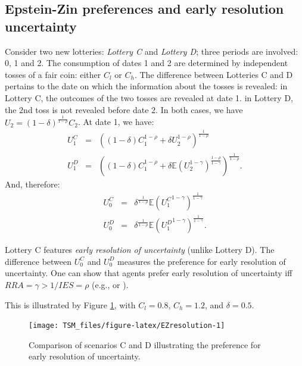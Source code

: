 \documentclass[
  12pt,
]{book}
\theoremstyle{definition}
\theoremstyle{definition}
\theoremstyle{definition}
\theoremstyle{definition}
\theoremstyle{remark}
\begin{document}
\hypertarget{epstein-zin-preferences-and-early-resolution-uncertainty}{%
\subsection{Epstein-Zin preferences and early resolution uncertainty}\label{epstein-zin-preferences-and-early-resolution-uncertainty}}

Consider two new lotteries: \emph{Lottery C} and \emph{Lottery D}; three periods are involved: 0, 1 and 2. The consumption of dates 1 and 2 are determined by independent tosses of a fair coin: either \(C_l\) or \(C_h\). The difference between Lotteries C and D pertains to the date on which the information about the tosses is revealed: in Lottery C, the outcomes of the two tosses are revealed at date 1. in Lottery D, the \(2\)nd toss is not revealed before date \(2\).
In both cases, we have \(U_2 = (1-\delta)^{\frac{1}{1-\rho}}C_{2}\).
At date 1, we have:
\begin{eqnarray*}
U_1^C &=& \left((1-\delta)C_1^{1-\rho} + \delta U_2^{1-\rho}\right)^{\frac{1}{1-\rho}}\\
U_1^D &=& \left((1-\delta)C_1^{1-\rho} + \delta \mathbb{E}(U_2^{1-\gamma})^{\frac{1-\rho}{1-\gamma}}\right)^{\frac{1}{1-\rho}}.
\end{eqnarray*}
And, therefore:
\begin{eqnarray*}
U_0^C &=& \delta^{\frac{1}{1-\rho}} \mathbb{E}({U_1^C}^{1-\gamma})^{\frac{1}{1-\gamma}}\\
U_0^D &=& \delta^{\frac{1}{1-\rho}} \mathbb{E}({U_1^D}^{1-\gamma})^{\frac{1}{1-\gamma}}.
\end{eqnarray*}

Lottery C features \emph{early resolution of uncertainty} (unlike Lottery D).
The difference between \(U_0^C\) and \(U_0^D\) measures the preference for early resolution of uncertainty.
One can show that agents prefer early resolution of uncertainty iff \(RRA = \gamma > 1/IES = \rho\) (e.g., \citet{Epstein_Fahri_Strzalecki_2014} or \citet{Duffie_Epstein_1992}).

This is illustrated by Figure \ref{fig:EZresolution}, with \(C_l = 0.8\), \(C_h = 1.2\), and \(\delta = 0.5\).

\begin{figure}
\texttt{[image: TSM\_files/figure-latex/EZresolution-1]} \caption{Comparison of scenarios C and D illustrating the preference for early resolution of uncertainty.}\label{fig:EZresolution}
\end{figure}
\end{document}
